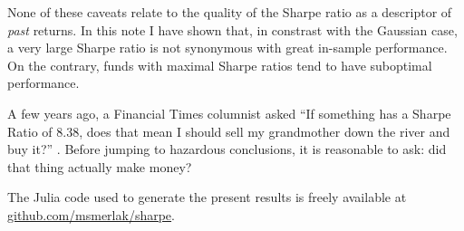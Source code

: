 \documentclass[
reprint,
amsmath,amssymb,
aps,
]{revtex4-2}
\begin{document}
None of these caveats relate to the quality of the Sharpe ratio as a descriptor of \emph{past} returns. 
In this note I have shown that, in constrast with the Gaussian case, a very large Sharpe ratio is not synonymous with great in-sample performance. 
On the contrary, funds with maximal Sharpe ratios tend to have suboptimal performance. 

A few years ago, a Financial Times columnist asked ``If something has a Sharpe Ratio of 8.38, does that mean I should sell my grandmother down the river and buy it?'' \cite{shubberIf2016}. 
Before jumping to hazardous conclusions, it is reasonable to ask: did that thing actually make money? 

\medskip

The Julia code used to generate the present results is freely available at \url{github.com/msmerlak/sharpe}. 


\end{document}
